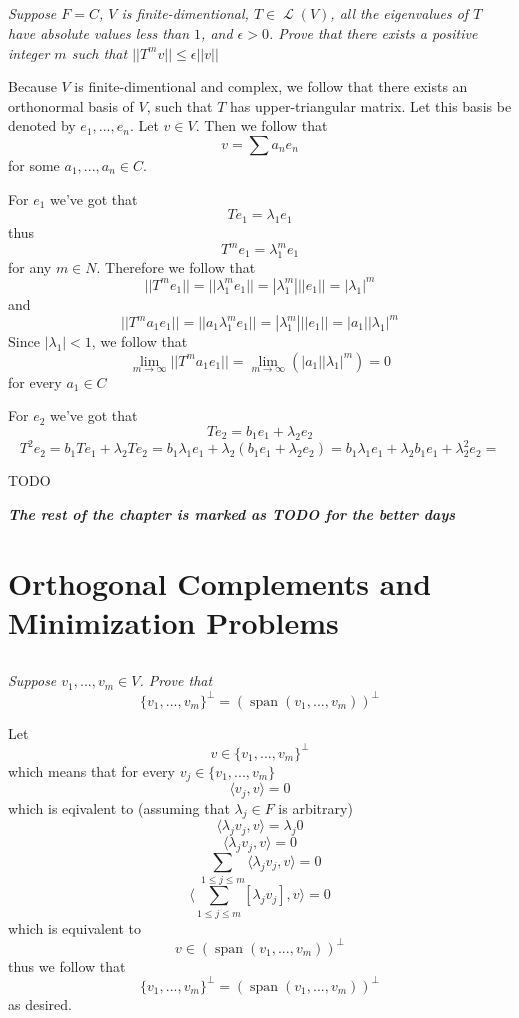 \documentclass[11pt,oneside,titlepage]{book}
\DeclareMathOperator \map {\mathcal {L}}
\DeclareMathOperator \Span {span}
\newcommand{\eangle}[1]{\langle #1 \rangle}
\begin{document}
\subsection{}

\textit{Suppose $F = C$, $V$ is finite-dimentional, $T \in \map(V)$, all the eigenvalues of $T$
  have absolute values less than $1$, and $\epsilon > 0$. Prove that there exists a
  positive integer $m$ such that $||T^m v|| \leq \epsilon ||v||$}

Because $V$ is finite-dimentional and complex, we follow that
there exists an orthonormal basis of $V$, such that $T$ has upper-triangular matrix. Let
this basis be denoted by $e_1, ..., e_n$. Let $v \in V$. Then we follow that
$$v = \sum{a_n e_n}$$
for some $a_1, ..., a_n \in C$.

For $e_1$ we've got that
$$T e_1 = \lambda_1 e_1$$
thus
$$T^m e_1 = \lambda_1^m e_1$$
for any $m \in N$. Therefore we follow that
$$||T^m e_1|| = ||\lambda_1^m e_1|| = |\lambda_1^m| ||e_1|| = |\lambda_1|^m$$
and
$$||T^m a_1 e_1|| = ||a_1 \lambda_1^m e_1|| = |\lambda_1^m| ||e_1|| = |a_1| |\lambda_1|^m$$
Since $|\lambda_1| < 1$, we follow that
$$\lim_{m \to \infty}{||T^m a_1 e_1||} = \lim_{m \to \infty}{(|a_1| |\lambda_1|^m)}= 0$$
for every $a_1 \in C$

For $e_2$ we've got that
$$T e_2 = b_1 e_1 + \lambda_2 e_2$$
$$T^2 e_2 = b_1 T e_1 + \lambda_2 T e_2 = b_1 \lambda_1 e_1 + \lambda_2 (b_1 e_1 + \lambda_2 e_2) =
b_1 \lambda_1 e_1 + \lambda_2 b_1 e_1 + \lambda_2^2  e_2 = $$

TODO

\textbf{\textit{The rest of the chapter is marked as TODO for the better days}}

\section{Orthogonal Complements and Minimization Problems}

\subsection{}

\textit{Suppose $v_1, ..., v_m \in V$. Prove that
  $$\{v_1, ..., v_m\}^\perp = (\Span(v_1, ..., v_m))^\perp$$}

Let 
$$v \in \{v_1, ..., v_m\}^\perp$$
which means that for every $v_j \in \{v_1, ..., v_m\}$
$$\eangle{v_j, v} = 0$$
which is eqivalent to (assuming that $\lambda_j \in F$ is arbitrary)
$$\eangle{\lambda_j v_j, v} = \lambda_j 0$$
$$\eangle{\lambda_j v_j, v} = 0$$
$$\sum_{1 \leq j \leq m}{\eangle{\lambda_j v_j, v}} = 0$$
$$\eangle{\sum_{1 \leq j \leq m}{ [\lambda_j v_j]}, v} = 0$$
which is equivalent to
$$v \in (\Span(v_1, ..., v_m))^\perp$$
thus we follow that
$$\{v_1, ..., v_m\}^\perp = (\Span(v_1, ..., v_m))^\perp$$
as desired.
\end{document}
